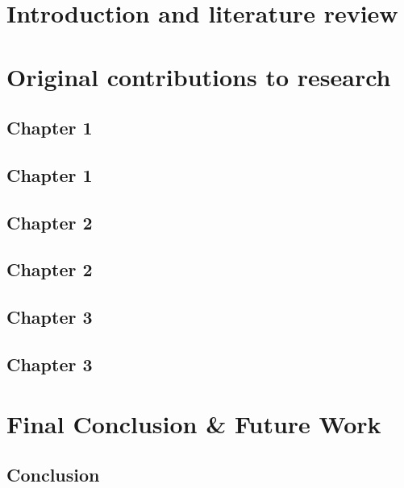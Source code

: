 \documentclass[12pt, TexShade, letterpaper]{report}
\makeatletter
\newcommand{\unchapter}[1]{%
  \begingroup
  \let\@makechapterhead\@gobble %
  \chapter{#1}
  \endgroup
}
\makeatother
\begin{document}
	
\glsaddall
\setlength\LTleft{0pt}
\setlength\LTright{0pt}
\setlength\glsdescwidth{0.8\hsize}
\printglossary[title={List of Acronyms}]

 \clearpage
	
\glsresetall

\cleardoublepage
\setcounter{page}{1}	

\part{Introduction and literature review}
\label{part:part0}



\part{Original contributions to research}
\label{part:part1}

\unchapter{Chapter 1}
\chapter*{Chapter 1}
\label{ch:chapter1}


\unchapter{Chapter 2}
\chapter*{Chapter 2}
\label{ch:chapter2}


\unchapter{Chapter 3}
\chapter*{Chapter 3}
\label{ch:chapter3}



\part{Final Conclusion \& Future Work}
\label{part:conclusion}
\chapter*{Conclusion}

\end{document}
